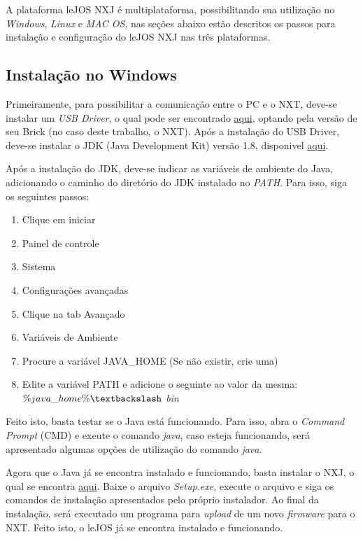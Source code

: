 A plataforma leJOS NXJ é multiplataforma, possibilitando sua utilização no \textit{Windows}, \textit{Linux} e \textit{MAC OS}, nas seções abaixo estão descritos os passos para instalação e configuração do leJOS NXJ nas três plataformas.

\subsection{Instalação no Windows} %
\label{sub:instalação_no_windows}

	Primeiramente, para possibilitar a comunicação entre o PC e o NXT, deve-se instalar um \textit{USB Driver}, o qual pode ser encontrado \href{https://www.lego.com/en-us/mindstorms/downloads}{aqui}, optando pela versão de seu Brick (no caso deste trabalho, o NXT). Após a instalação do USB Driver, deve-se instalar o JDK (Java Development Kit) versão 1.8, disponivel \href{http://www.oracle.com/technetwork/java/}{aqui}.

	Após a instalação do JDK, deve-se indicar as variáveis de ambiente do Java, adicionando o caminho do diretório do JDK instalado no \textit{PATH}. Para isso, siga os seguintes passos:

	\begin{enumerate}
		\item Clique em iniciar
		\item Painel de controle
		\item Sistema
		\item Configurações avançadas
		\item Clique na tab Avançado
		\item Variáveis de Ambiente
		\item Procure a variável JAVA\_HOME (Se não existir, crie uma)
		\item Edite a variável PATH e adicione o seguinte ao valor da mesma: \textit{$\%java\_home\% \textbackslash$ bin}
	\end{enumerate}

	Feito isto, basta testar se o Java está funcionando. Para isso, abra o \textit{Command Prompt} (CMD) e exeute o comando \textit{java}, caso esteja funcionando, será apresentado algumas opções de utilização do comando \textit{java}.

	Agora que o Java já se encontra instalado e funcionando, basta instalar o NXJ, o qual se encontra \href{http://www.lejos.org/}{aqui}. Baixe o arquivo \textit{Setup.exe}, execute o arquivo e siga os comandos de instalação apresentados pelo próprio instalador. Ao final da instalação, será executado um programa para \textit{upload} de um novo \textit{firmware} para o NXT. Feito isto, o leJOS já se encontra instalado e funcionando.

